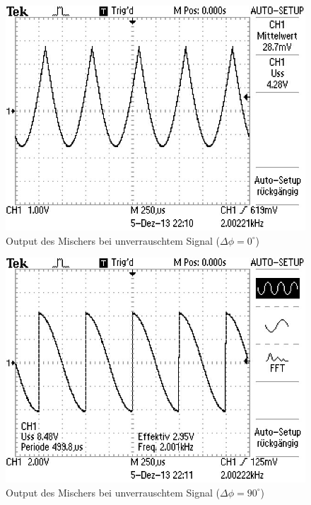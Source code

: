 \documentclass[11pt]{article}
\begin{document}
\begin{figure}[h]
\centering
\includegraphics[scale=0.85]{Bilder/5-sine-0.png}
\caption{Output des Mischers bei unverrauschtem Signal ($\Delta\phi=0^\circ$)}
\label{Abb7}
\end{figure}

\begin{figure}[h]
\centering
\includegraphics[scale=0.85]{Bilder/5-sine-90.png}
\caption{Output des Mischers bei unverrauschtem Signal ($\Delta\phi=90^\circ$) }
\label{Abb8}
\end{figure}
\end{document}
